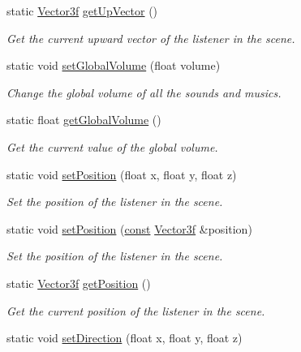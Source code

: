 \begin{DoxyCompactItemize}
static \hyperlink{namespacesf_a36e44d9e6d8f649703698ec9d24ac052}{Vector3f} \hyperlink{classsf_1_1_listener_ae1427dd7e9b425b0c23b7b766bd6c6e6}{get\-Up\-Vector} ()
\begin{DoxyCompactList}\small\item\em Get the current upward vector of the listener in the scene. \end{DoxyCompactList}\item 
static void \hyperlink{classsf_1_1_listener_a803a24a1fc04620cacc9f88c6fbc0e3a}{set\-Global\-Volume} (float volume)
\begin{DoxyCompactList}\small\item\em Change the global volume of all the sounds and musics. \end{DoxyCompactList}\item 
static float \hyperlink{classsf_1_1_listener_a137ea535799bdf70be6ec969673d4d33}{get\-Global\-Volume} ()
\begin{DoxyCompactList}\small\item\em Get the current value of the global volume. \end{DoxyCompactList}\item 
static void \hyperlink{classsf_1_1_listener_a5bc2d8d18ea2d8f339d23cbf17678564}{set\-Position} (float x, float y, float z)
\begin{DoxyCompactList}\small\item\em Set the position of the listener in the scene. \end{DoxyCompactList}\item 
static void \hyperlink{classsf_1_1_listener_a28a27d85cfbf8065c535c39176898fcb}{set\-Position} (\hyperlink{term__entry_8h_a57bd63ce7f9a353488880e3de6692d5a}{const} \hyperlink{namespacesf_a36e44d9e6d8f649703698ec9d24ac052}{Vector3f} \&position)
\begin{DoxyCompactList}\small\item\em Set the position of the listener in the scene. \end{DoxyCompactList}\item 
static \hyperlink{namespacesf_a36e44d9e6d8f649703698ec9d24ac052}{Vector3f} \hyperlink{classsf_1_1_listener_acd7ee65bc948ca38e1c669aa12340c54}{get\-Position} ()
\begin{DoxyCompactList}\small\item\em Get the current position of the listener in the scene. \end{DoxyCompactList}\item 
static void \hyperlink{classsf_1_1_listener_ae479dc15513c6557984d26e32d06d06e}{set\-Direction} (float x, float y, float z)

\end{DoxyCompactItemize}
